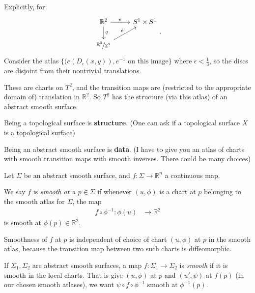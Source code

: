 Explicitly, for
        \[
            \begin{tikzcd}
                \mathbb{R}^2 \arrow[d,"q"] \arrow[r, "e"] & S^1\times S^1 \\ \nicefrac{\mathbb{R}^2}{\mathbb{Z}^2} \arrow[ru, "\hat{e}"]& 
            \end{tikzcd}.
        \]
Consider the atlas \(\{(e(D_{\epsilon}(x, y)),e^{-1} \text{ on this image} \}\) where \(\epsilon < \frac{1}{3}\), so the discs are disjoint from their nontrivial translations.

These are charts on \(T^2\), and the transition maps are (restricted to the appropriate domain of) translation in \(\mathbb{R}^2\). So \(T^2\) has the structure (via this atlas) of an abstract smooth surface.

\begin{remark}[Philosophical]
    Being a topological surface is \textbf{structure}. (One can ask if a topological surface \(X\) is a topological surface)

    Being an abstract smooth surface is \textbf{data}. (I have to give you an atlas of charts with smooth transition maps with smooth inverses. There could be many choices)
\end{remark}
\begin{definition}{}{}
    Let \(\Sigma\) be an abstract smooth surface, and \(f: \Sigma \to \mathbb{R}^n\) a continuous map.

    We say \(f\) is \textit{smooth at a \(p \in \Sigma\)} if whenever \((u , \phi)\) is a chart at \(p\) belonging to the smooth atlas for \(\Sigma\), the map
    \begin{equation*}
    \begin{aligned}
      f \circ \phi^{-1}\colon \phi(u) & \longrightarrow \mathbb{R}^2
    \end{aligned}
    \end{equation*}
    is smooth at \(\phi(p)\in \mathbb{R}^2\).
\end{definition}
\begin{note}
    Smoothness of \(f\) at \(p\) is independent of choice of chart \((u, \phi)\) at \(p\) in the smooth atlas, because the transition map between two such charts is diffeomorphic.
\end{note}
\begin{definition}{}{}
    If \(\Sigma_1, \Sigma_2\) are abstract smooth surfaces, a map \(f: \Sigma_1 \to \Sigma_2\) is \textit{smooth} if it is smooth in the local charts. That is give \((u, \phi)\) at \(p\) and \((u', \psi)\) at \(f(p)\) (in our chosen smooth atlases), we want \(\psi \circ f \circ \phi^{-1}\) smooth at \(\phi^{-1}(p)\).
\end{definition}
